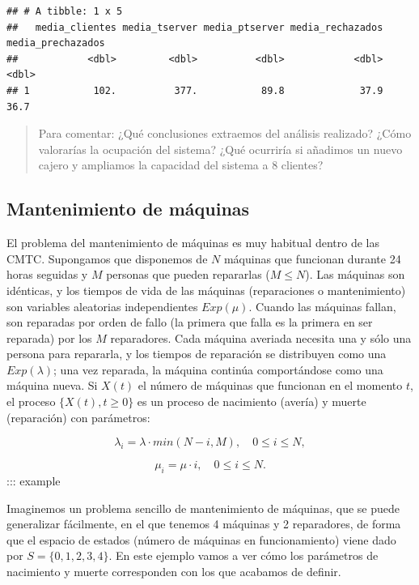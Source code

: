 \documentclass[
]{book}
\theoremstyle{definition}
\theoremstyle{definition}
\theoremstyle{definition}
\theoremstyle{definition}
\theoremstyle{remark}
\begin{document}
\begin{verbatim}
## # A tibble: 1 x 5
##   media_clientes media_tserver media_ptserver media_rechazados media_prechazados
##            <dbl>         <dbl>          <dbl>            <dbl>             <dbl>
## 1           102.          377.           89.8             37.9              36.7
\end{verbatim}

\begin{quote}
Para comentar: ¿Qué conclusiones extraemos del análisis realizado? ¿Cómo valorarías la ocupación del sistema? ¿Qué ocurriría si añadimos un nuevo cajero y ampliamos la capacidad del sistema a 8 clientes?
\end{quote}

\hypertarget{excmtc007}{%
\subsection{Mantenimiento de máquinas}\label{excmtc007}}

El problema del mantenimiento de máquinas es muy habitual dentro de las CMTC. Supongamos que disponemos de \(N\) máquinas que funcionan durante 24 horas seguidas y \(M\) personas que pueden repararlas (\(M \leq N\)). Las máquinas son idénticas, y los tiempos de vida de las máquinas (reparaciones o mantenimiento) son variables aleatorias independientes \(Exp(\mu)\). Cuando las máquinas fallan, son reparadas por orden de fallo (la primera que falla es la primera en ser reparada) por los \(M\) reparadores. Cada máquina averiada necesita una y sólo una persona para repararla, y los tiempos de reparación se distribuyen como una \(Exp(\lambda)\); una vez reparada, la máquina continúa comportándose como una máquina nueva. Si \(X(t)\) el número de máquinas que funcionan en el momento \(t\), el proceso \(\{X(t), t \geq 0\}\) es un proceso de nacimiento (avería) y muerte (reparación) con parámetros:

\[\lambda_i = \lambda \cdot min(N-i, M), \quad 0 \leq i \leq N,\]

\[\mu_i = \mu \cdot i, \quad 0 \leq i \leq N.\]
::: example

Imaginemos un problema sencillo de mantenimiento de máquinas, que se puede generalizar fácilmente, en el que tenemos 4 máquinas y 2 reparadores, de forma que el espacio de estados (número de máquinas en funcionamiento) viene dado por \(S = \{0, 1, 2, 3, 4\}\). En este ejemplo vamos a ver cómo los parámetros de nacimiento y muerte corresponden con los que acabamos de definir.
\end{document}
